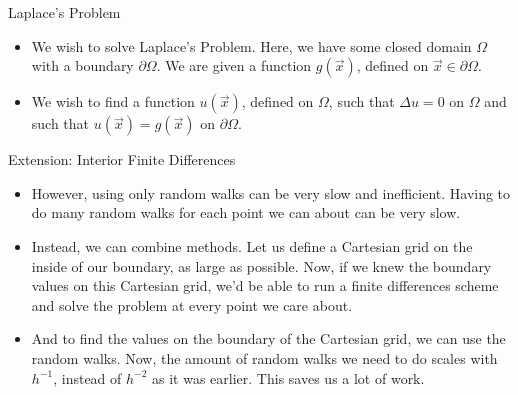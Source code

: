\documentclass{beamer}
\newcommand\di\partial
\newcommand\pars[1]{\left(#1\right)}
\begin{document}
\begin{frame}{Laplace's Problem}
\begin{itemize}
\item We wish to solve Laplace's Problem.
Here, we have some closed domain $\Omega$ with a boundary $\di\Omega$.
We are given a function $g\pars{\vec{x}}$, defined on $\vec{x}\in\di\Omega$.
\item We wish to find a function $u\pars{\vec{x}}$, defined on $\Omega$,
such that $\Delta u=0$ on $\Omega$
and such that $u\pars{\vec{x}}=g\pars{\vec{x}}$ on $\di\Omega$.
\end{itemize}
\end{frame}

\begin{frame}{Extension: Interior Finite Differences}
\begin{itemize}
\item However, using only random walks can be very slow and inefficient.
Having to do many random walks for each point we can about can be very slow.
\item Instead, we can combine methods.
Let us define a Cartesian grid on the inside of our boundary,
as large as possible.
Now, if we knew the boundary values on this Cartesian grid,
we'd be able to run a finite differences scheme
and solve the problem at every point we care about.
\item And to find the values on the boundary of the Cartesian grid,
we can use the random walks.
Now, the amount of random walks we need to do scales with $h^{-1}$,
instead of $h^{-2}$ as it was earlier.
This saves us a lot of work.
\end{itemize}
\end{frame}
\end{document}
